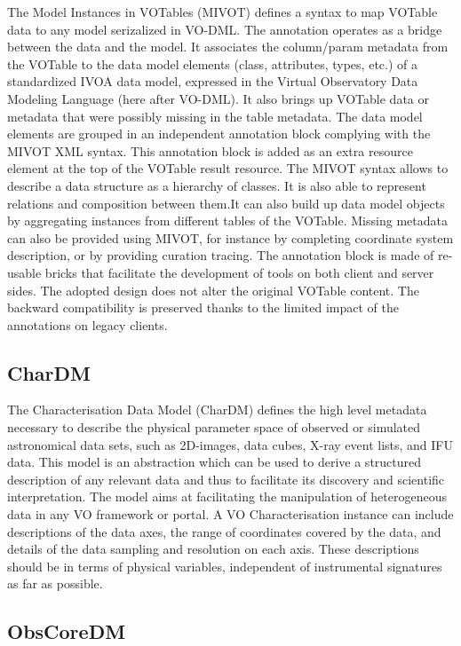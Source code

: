 \documentclass[11pt,letter]{ivoa}
\begin{document}
The Model Instances in VOTables (MIVOT) \citep{2023ivoa.spec.0620M} defines a syntax to map VOTable data to any model serizalized in VO-DML. The annotation operates as a bridge between the data and the model. It associates the column/param metadata from the VOTable to the data model elements (class, attributes, types, etc.) of a standardized IVOA data model, expressed in the Virtual Observatory Data Modeling Language (here after VO-DML). It also brings up VOTable data or metadata that were possibly missing in the table metadata. The data model elements are grouped in an independent annotation block complying with the MIVOT XML syntax. This annotation block is added as an extra resource element at the top of the VOTable result resource. The MIVOT syntax allows to describe a data structure as a hierarchy of classes. It is also able to represent relations and composition between them.It can also build up data model objects by aggregating instances from different tables of the VOTable. Missing metadata can also be provided using MIVOT, for instance by completing coordinate system description, or by providing curation tracing. The annotation block is made of re-usable bricks that facilitate the development of tools on both client and server sides. The adopted design does not alter the original VOTable content. The backward compatibility is preserved thanks to the limited impact of the annotations on legacy clients.


\subsection{CharDM} 

The Characterisation Data Model (CharDM) \citep{2008ivoa.spec.0325L} defines the high level metadata necessary to describe the 
physical parameter space of observed or simulated astronomical data sets, such as 2D-images, 
data cubes, X-ray event lists, and IFU data. This model is an abstraction which can be used 
to derive a structured description of any relevant data and thus to facilitate its discovery 
and scientific interpretation. The model aims at facilitating the manipulation of heterogeneous 
data in any VO framework or portal. A VO Characterisation instance can include descriptions of 
the data axes, the range of coordinates covered by the data, and details of the data sampling 
and resolution on each axis. These descriptions should be in terms of physical variables, 
independent of instrumental signatures as far as possible.

\subsection{ObsCoreDM}
\end{document}
